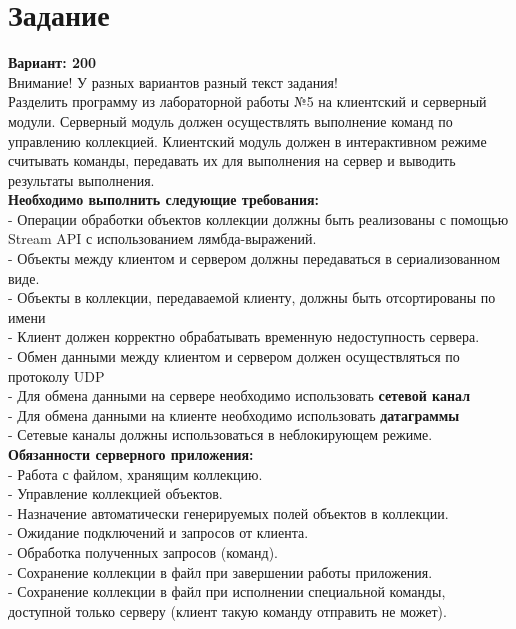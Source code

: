 \section{Задание}

\textbf{Вариант: 200} \\
Внимание! У разных вариантов разный текст задания!\\
Разделить программу из лабораторной работы №5 на клиентский и серверный модули. Серверный модуль должен осуществлять выполнение команд по управлению коллекцией. Клиентский модуль должен в интерактивном режиме считывать команды, передавать их для выполнения на сервер и выводить результаты выполнения.\\

\textbf{Необходимо выполнить следующие требования:}\\
- Операции обработки объектов коллекции должны быть реализованы с помощью Stream API с использованием лямбда-выражений.\\
	- Объекты между клиентом и сервером должны передаваться в сериализованном виде.\\
	- Объекты в коллекции, передаваемой клиенту, должны быть отсортированы по имени\\
	- Клиент должен корректно обрабатывать временную недоступность сервера.\\
	- Обмен данными между клиентом и сервером должен осуществляться по протоколу UDP\\
	- Для обмена данными на сервере необходимо использовать \textbf{сетевой канал}\\
	- Для обмена данными на клиенте необходимо использовать \textbf{датаграммы}\\
	- Сетевые каналы должны использоваться в неблокирующем режиме.\\
	
\textbf{Обязанности серверного приложения:}\\
- Работа с файлом, хранящим коллекцию.\\
	- Управление коллекцией объектов.\\
	- Назначение автоматически генерируемых полей объектов в коллекции.\\
	- Ожидание подключений и запросов от клиента.\\
	- Обработка полученных запросов (команд).\\
	- Сохранение коллекции в файл при завершении работы приложения.\\
	- Сохранение коллекции в файл при исполнении специальной команды, доступной только серверу (клиент такую команду отправить не может).\\
	
